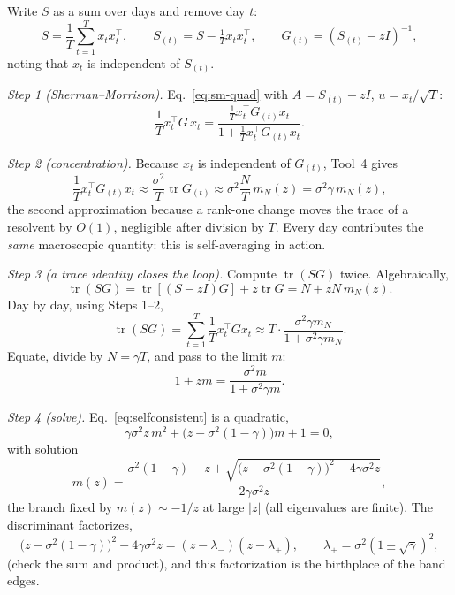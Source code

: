 \documentclass[11pt]{article}
\newcommand{\lplus}{\lambda_{+}}
\newcommand{\lminus}{\lambda_{-}}
\newcommand{\tr}{\operatorname{tr}}
\begin{document}
Write $S$ as a sum over days and remove day $t$:
\[
S=\frac1T\sum_{t=1}^{T}x_t x_t^{\top},\qquad
S_{(t)}=S-\tfrac1T x_t x_t^{\top},\qquad
G_{(t)}=(S_{(t)}-zI)^{-1},
\]
noting that $x_t$ is independent of $S_{(t)}$.

\emph{Step 1 (Sherman--Morrison).} Eq.~\eqref{eq:sm-quad} with
$A=S_{(t)}-zI$, $u=x_t/\sqrt T$:
\begin{equation}
\frac1T x_t^{\top}G\,x_t
=\frac{\frac1T x_t^{\top}G_{(t)}x_t}{1+\frac1T x_t^{\top}G_{(t)}x_t}.
\label{eq:step1}
\end{equation}

\emph{Step 2 (concentration).} Because $x_t$ is independent of $G_{(t)}$,
Tool~4 gives
\begin{equation}
\frac1T x_t^{\top}G_{(t)}x_t
\approx\frac{\sigma^{2}}{T}\tr G_{(t)}
\approx\sigma^{2}\frac NT\,m_N(z)=\sigma^{2}\gamma\,m_N(z),
\label{eq:step2}
\end{equation}
the second approximation because a rank-one change moves the trace of a
resolvent by $O(1)$, negligible after division by $T$. Every day
contributes the \emph{same} macroscopic quantity: this is self-averaging
in action.

\emph{Step 3 (a trace identity closes the loop).} Compute $\tr(SG)$ twice.
Algebraically,
\[
\tr(SG)=\tr[(S-zI)G]+z\tr G=N+zN\,m_N(z).
\]
Day by day, using Steps 1--2,
\[
\tr(SG)=\sum_{t=1}^{T}\frac1T x_t^{\top}Gx_t
\approx T\cdot\frac{\sigma^{2}\gamma m_N}{1+\sigma^{2}\gamma m_N}.
\]
Equate, divide by $N=\gamma T$, and pass to the limit $m$:
\begin{equation}
1+zm=\frac{\sigma^{2}m}{1+\sigma^{2}\gamma m}.
\label{eq:selfconsistent}
\end{equation}

\emph{Step 4 (solve).} Eq.~\eqref{eq:selfconsistent} is a quadratic,
\[
\gamma\sigma^{2}z\,m^{2}+\bigl(z-\sigma^{2}(1-\gamma)\bigr)m+1=0,
\]
with solution
\begin{equation}
m(z)=\frac{\sigma^{2}(1-\gamma)-z
+\sqrt{\bigl(z-\sigma^{2}(1-\gamma)\bigr)^{2}-4\gamma\sigma^{2}z}}
{2\gamma\sigma^{2}z},
\label{eq:msolved}
\end{equation}
the branch fixed by $m(z)\sim-1/z$ at large $|z|$ (all eigenvalues are
finite). The discriminant factorizes,
\[
\bigl(z-\sigma^{2}(1-\gamma)\bigr)^{2}-4\gamma\sigma^{2}z
=(z-\lminus)(z-\lplus),\qquad
\lambda_{\pm}=\sigma^{2}(1\pm\sqrt\gamma)^{2},
\]
(check the sum and product), and this factorization is the birthplace of
the band edges.
\end{document}
